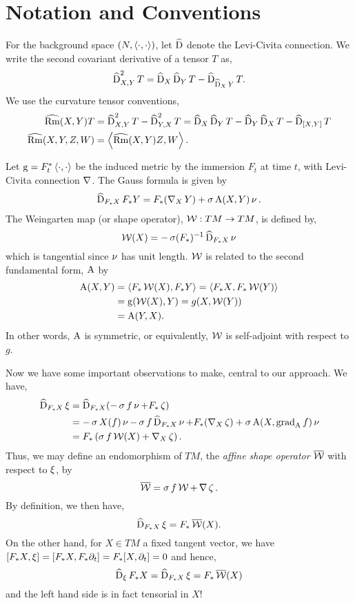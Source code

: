 \documentclass{amsart}
\begin{document}
\section{Notation and Conventions}

For the background space \((N, \bgg)\), let \(\operatorname{\widehat{D}}\) denote the Levi-Civita connection. We write the second covariant derivative of a tensor \(T\) as,
\[
\operatorname{\widehat{D}}^2_{X, Y} T = \operatorname{\widehat{D}}_X \operatorname{\widehat{D}}_Y T - \operatorname{\widehat{D}}_{\operatorname{\widehat{D}}_X Y} T.
\]
We use the curvature tensor conventions,
\begin{align*}
\bgRm(X, Y) T &= \bgD^2_{X, Y} T - \bgD^2_{Y, X} T = \bgD_X \bgD_Y T - \bgD_Y \bgD_X T - \bgD_{[X, Y]} T \\
\bgRm(X, Y, Z, W) &= \bgg[\bgRm(X, Y) Z][W].
\end{align*}

Let $\g = F_t^{\ast} \bgg$ be the induced metric by the immersion \(F_t\) at time \(t\), with Levi-Civita connection \(\operatorname{\nabla}\). The Gauss formula is given by
\begin{align}\label{gauss equ}
\operatorname{\widehat{D}}_{F_{\ast} X} F_{\ast} Y = F_{\ast}(\operatorname{\nabla}_X Y) + \operatorname{\sigma} \operatorname{A}(X,Y) \operatorname{\nu}.
\end{align}
The Weingarten map (or shape operator), \(\operatorname{\mathcal{W}} : TM \to TM\), is defined by,
\[
\operatorname{\mathcal{W}}(X) = -\operatorname{\sigma} (F_{\ast})^{-1} \operatorname{\widehat{D}}_{F_{\ast} X} \operatorname{\nu}
\]
which is tangential since \(\operatorname{\nu}\) has unit length. \(\operatorname{\mathcal{W}}\) is related to the second fundamental form, \(\operatorname{A}\) by
\[
\begin{split}
\sff(X, Y) &= \bgg[F_{\ast} \weingarten(X)][F_{\ast} Y] = \bgg[F_{\ast} X][F_{\ast} \weingarten(Y)] \\
&= \g(\weingarten(X), Y) = g(X, \weingarten(Y)) \\
&= \sff(Y, X).
\end{split}
\]
In other words, \(\operatorname{A}\) is symmetric, or equivalently, \(\operatorname{\mathcal{W}}\) is self-adjoint with respect to \(g\).

Now we have some important observations to make, central to our approach. We have,
\begin{align*}
\operatorname{\widehat{D}}_{F_{\ast}X} \operatorname{\xi} &= \operatorname{\widehat{D}}_{F_{\ast}X} (- \operatorname{\sigma} f \operatorname{\nu} + F_{\ast}\operatorname{\zeta}) \\
&= -\operatorname{\sigma} X(f) \operatorname{\nu} - \operatorname{\sigma} f \operatorname{\widehat{D}}_{F_{\ast}X} \operatorname{\nu} + F_{\ast}(\operatorname{\nabla}_X \operatorname{\zeta}) + \operatorname{\sigma} \operatorname{A} (X, \operatorname{grad}_{\operatorname{A}} f) \operatorname{\nu} \\
&= F_{\ast} \left(\operatorname{\sigma} f \operatorname{\mathcal{W}} (X) + \operatorname{\nabla}_X \operatorname{\zeta}\right).
\end{align*}
Thus, we may define an endomorphism of $TM$, the \emph{affine shape operator} $\operatorname{\overline{\operatorname{\mathcal{W}}}}$ with respect to $\operatorname{\xi}$, by
\begin{equation}
\label{eq:affshape}
\operatorname{\overline{\operatorname{\mathcal{W}}}} = \operatorname{\sigma} f \operatorname{\mathcal{W}} + \operatorname{\nabla} \operatorname{\zeta}.
\end{equation}
By definition, we then have,
\[
\operatorname{\widehat{D}}_{F_{\ast} X} \operatorname{\xi} = F_{\ast} \operatorname{\overline{\operatorname{\mathcal{W}}}}(X).
\]
On the other hand, for \(X \in TM\) a fixed tangent vector, we have \([F_{\ast} X, \operatorname{\xi}] = [F_{\ast} X, F_{\ast} \partial_t] = F_{\ast} [X, \partial_t] = 0\) and hence,
\[
\operatorname{\widehat{D}}_{\operatorname{\xi}} F_{\ast} X = \operatorname{\widehat{D}}_{F_{\ast} X} \operatorname{\xi} = F_{\ast} \operatorname{\overline{\operatorname{\mathcal{W}}}}(X)
\]
and the left hand side is in fact tensorial in \(X\)!
\end{document}
